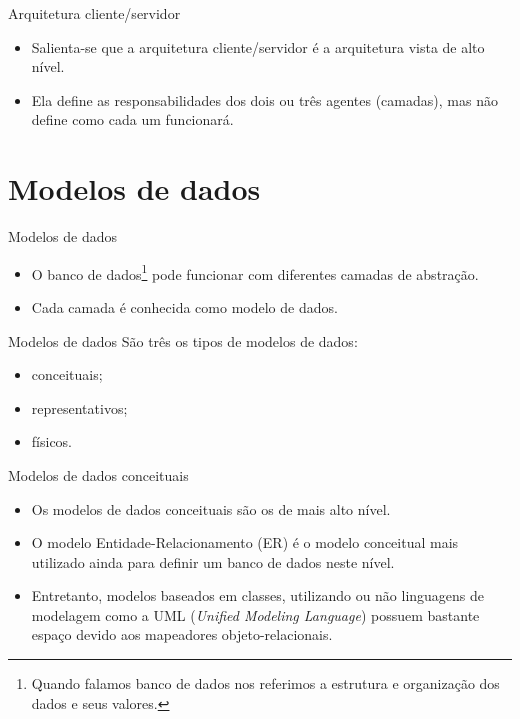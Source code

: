 \documentclass[11pt]{beamer}
\begin{document}
\begin{frame}{Arquitetura cliente/servidor}
    \begin{itemize}
        \item Salienta-se que a arquitetura cliente/servidor é a arquitetura vista de alto nível.
        \item Ela define as responsabilidades dos dois ou três agentes (camadas), mas não define como cada um funcionará.
    \end{itemize}
\end{frame}

\section{Modelos de dados}

\begin{frame}{Modelos de dados}
    \begin{itemize}
        \item O banco de dados\footnote{Quando falamos banco de dados nos referimos a estrutura e organização dos dados e seus valores.} pode funcionar com diferentes camadas de abstração.
        \item Cada camada é conhecida como modelo de dados.
    \end{itemize}
\end{frame}

\begin{frame}{Modelos de dados}
    São três os tipos de modelos de dados:
    \begin{itemize}
        \item conceituais;
        \item representativos;
        \item físicos.
    \end{itemize}
\end{frame}

\begin{frame}{Modelos de dados conceituais}
    \begin{itemize}
        \item Os modelos de dados conceituais são os de mais alto nível.
        \item O modelo Entidade-Relacionamento (ER) é o modelo conceitual mais utilizado ainda para definir um banco de dados neste nível.
        \item Entretanto, modelos baseados em classes, utilizando ou não linguagens de modelagem como a UML (\textit{Unified Modeling Language}) possuem bastante espaço devido aos mapeadores objeto-relacionais.
    \end{itemize}
\end{frame}
\end{document}

